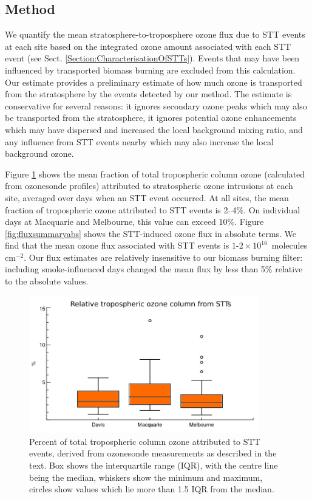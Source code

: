 \documentclass[acp, manuscript]{copernicus} %
\begin{document}
  \subsection{Method}
    We quantify the mean stratosphere-to-troposphere ozone flux due to STT events at each site based on the integrated ozone amount associated with each STT event (see Sect. \ref{Section:CharacterisationOfSTTs}).
    Events that may have been influenced by transported biomass burning are excluded from this calculation.
    Our estimate provides a preliminary estimate of how much ozone is transported from the stratosphere by the events detected by our method.
    The estimate is conservative for several reasons: it ignores secondary ozone peaks which may also be transported from the stratosphere, it ignores potential ozone enhancements which may have dispersed and increased the local background mixing ratio, and any influence from STT events nearby which may also increase the local background ozone.
    
    Figure \ref{fig:fluxsummary} shows the mean fraction of total tropospheric column ozone (calculated from ozonesonde profiles) attributed to stratospheric ozone intrusions at each site, averaged over days when an STT event occurred.
    At all sites, the mean fraction of tropospheric ozone attributed to STT events is 2--4\%. On individual days at Macquarie and Melbourne, this value can exceed 10\%.
    Figure \ref{fig:fluxsummaryabs} shows the STT-induced ozone flux in absolute terms.
    We find that the mean ozone flux associated with STT events is $1$-$2 \times 10^{16}$~molecules cm$^{-2}$.
    Our flux estimates are relatively insensitive to our biomass burning filter: including smoke-influenced days changed the mean flux by less than 5\% relative to the absolute values.
    
    \begin{figure}
      \includegraphics[width=10cm]{figures/flux_relative.png}
      \caption{%
	Percent of total tropospheric column ozone attributed to STT events, derived from ozonesonde measurements as described in the text.
	Box shows the interquartile range (IQR), with the centre line being the median, whiskers show the minimum and maximum, circles show values which lie more than 1.5 IQR from the median.}
      \label{fig:fluxsummary}
    \end{figure}
    
\end{document}
